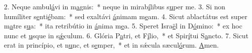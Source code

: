 2. Neque ambul\uline{á}vi in m\uline{a}gnis:~* neque in mirab\uline{í}libus s\uline{u}per me.
3. Si non humíliter s\uline{e}nti\uline{é}bam:~* sed exaltávi \uline{á}nimam m\uline{e}am.
4. Sicut ablactátus est super m\uline{a}tre s\uline{u}a:~* ita retribútio in \uline{á}nima m\uline{e}a.
5. Speret Isra\uline{ë}l in D\uline{ó}mino:~* ex hoc nunc et \uline{u}sque in s\uline{ǽ}culum.
6. Glória P\uline{a}tri, et F\uline{í}lio,~* et Spir\uline{í}tui S\uline{a}ncto.
7. Sicut erat in princípio, et n\uline{u}nc, et s\uline{e}mper,~* et in sǽcula sæcul\uline{ó}rum. \uline{A}men.
